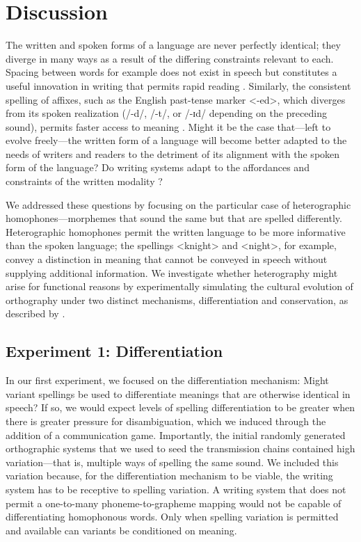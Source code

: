 \documentclass[doc,biblatex]{apa7}
\begin{document}

\section{Discussion}

The written and spoken forms of a language are never perfectly identical; they diverge in many ways as a result of the differing constraints relevant to each. Spacing between words for example does not exist in speech but constitutes a useful innovation in writing that permits rapid reading \parencite{RaynerFischer:1998, Sainio:2007, Zang:2013}. Similarly, the consistent spelling of affixes, such as the English past-tense marker <-ed>, which diverges from its spoken realization (/-d/, /-t/, or /-ɪd/ depending on the preceding sound), permits faster access to meaning \parencite{Ulicheva:2020}. Might it be the case that---left to evolve freely---the written form of a language will become better adapted to the needs of writers and readers to the detriment of its alignment with the spoken form of the language? Do writing systems adapt to the affordances and constraints of the written modality \parencite{Rastle:2019}?

We addressed these questions by focusing on the particular case of heterographic homophones---morphemes that sound the same but that are spelled differently. Heterographic homophones permit the written language to be more informative than the spoken language; the spellings <knight> and <night>, for example, convey a distinction in meaning that cannot be conveyed in speech without supplying additional information. We investigate whether heterography might arise for functional reasons by experimentally simulating the cultural evolution of orthography under two distinct mechanisms, differentiation and conservation, as described by \textcite{Berg:2021}.

\subsection{Experiment 1: Differentiation}

In our first experiment, we focused on the differentiation mechanism: Might variant spellings be used to differentiate meanings that are otherwise identical in speech? If so, we would expect levels of spelling differentiation to be greater when there is greater pressure for disambiguation, which we induced through the addition of a communication game. Importantly, the initial randomly generated orthographic systems that we used to seed the transmission chains contained high variation---that is, multiple ways of spelling the same sound. We included this variation because, for the differentiation mechanism to be viable, the writing system has to be receptive to spelling variation. A writing system that does not permit a one-to-many phoneme-to-grapheme mapping would not be capable of differentiating homophonous words. Only when spelling variation is permitted and available can variants be conditioned on meaning.
\end{document}
